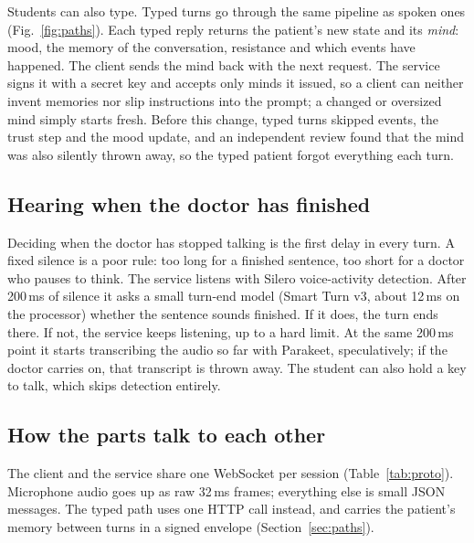 \documentclass[journal]{IEEEtran}
\begin{document}
Students can also type. Typed turns go through the same pipeline as spoken ones (Fig.~\ref{fig:paths}). Each typed reply returns the patient's new
state and its \emph{mind}: mood, the memory of the conversation, resistance and which events have happened. The client sends the mind back with
the next request. The service signs it with a secret key and accepts only minds it issued, so a client can neither invent memories nor slip
instructions into the prompt; a changed or oversized mind simply starts fresh. Before this change, typed turns skipped events, the trust step and
the mood update, and an independent review found that the mind was also silently thrown away, so the typed patient forgot everything each turn.

\subsection{Hearing when the doctor has finished}
Deciding when the doctor has stopped talking is the first delay in every turn. A fixed silence is a poor rule: too long for a finished sentence,
too short for a doctor who pauses to think. The service listens with Silero voice-activity detection. After 200\,ms of silence it asks a small turn-end model (Smart Turn v3, about 12\,ms on the processor) whether the sentence sounds finished. If it does, the turn ends there. If not, the service keeps listening, up to a hard limit. At the same 200\,ms point it starts transcribing the audio so far with Parakeet, speculatively; if the
doctor carries on, that transcript is thrown away. The student can also hold a key to talk, which skips detection entirely.

\subsection{How the parts talk to each other}
The client and the service share one WebSocket per session (Table~\ref{tab:proto}). Microphone audio goes up as raw 32\,ms frames; everything
else is small JSON messages. The typed path uses one HTTP call instead, and carries the patient's memory between turns in a signed envelope
(Section~\ref{sec:paths}).
\end{document}

